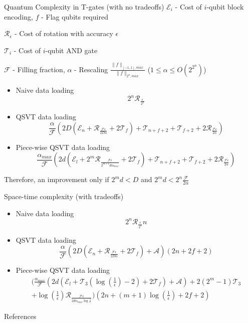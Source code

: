 \documentclass{beamer}
\begin{document}
\begin{frame}{Quantum Complexity in T-gates (with no tradeoffs)}
$\mathcal{E}_i$ - Cost of $i$-qubit block encoding, $f$ - Flag qubits required

$\mathcal{R}_{\epsilon}$ - Cost of rotation with accuracy $\epsilon$

$\mathcal{T}_i$ - Cost of $i$-qubit AND gate

$\mathcal{F}$ - Filling fraction, $\alpha$ - Rescaling $\frac{\|f\|_{[-1,1],max}}{\|f\|_{2^n,max}}$ ($1 \leq \alpha \leq O(2^{2^n})$)
\begin{itemize}
    \item Naive data loading
    $$
    2^n\mathcal{R}_{\frac{\epsilon}{2^n}}
    $$
    \item QSVT data loading
        $$
        \frac{\alpha}{\mathcal{F}}(2D(\mathcal{E}_n+\mathcal{R}_{\frac{\mathcal{F}\epsilon}{2D \alpha }}+2\mathcal{T}_f)+\mathcal{T}_{n+f+2}+\mathcal{T}_{f+2}+2\mathcal{R}_{\frac{\mathcal{F}\epsilon}{2 \alpha }})
        $$
    \item Piece-wise QSVT data loading
    $$
        \frac{\alpha_{max}}{\mathcal{F}}(2d(\mathcal{E}_l+2^m\mathcal{R}_{\frac{\mathcal{F}\epsilon}{2^{m+1}d  \alpha_{max} }}+2\mathcal{T}_f)+\mathcal{T}_{n+f+2}+\mathcal{T}_{f+2}+2\mathcal{R}_{\frac{\mathcal{F}\epsilon}{2 \alpha }})
        $$
\end{itemize}
    Therefore, an improvement only if $2^md < D$ and $2^md < 2^n\frac{\mathcal{F}}{2\alpha}$
\end{frame}
\begin{frame}{Space-time complexity (with tradeoffs)}
\begin{itemize}
    \item Naive data loading
    $$
    2^n\mathcal{R}_{\frac{\epsilon}{2^n}}n
    $$
    \item QSVT data loading
        $$
         \frac{\alpha}{\mathcal{F}}(2D(\mathcal{E}_n+\mathcal{R}_{\frac{\mathcal{F}\epsilon}{2D \alpha }}+2\mathcal{T}_f)+\mathcal{A})(2n + 2f+2)
        $$
    \item Piece-wise QSVT data loading
    \begin{multline*}
        \bigg( \frac{\alpha_{max}}{\mathcal{F}}(2d(\mathcal{E}_l+\mathcal{T}_3 (\log \left(\frac{1}{\epsilon}\right) -2)+2\mathcal{T}_f)+\mathcal{A})+ 2(2^m -1)\mathcal{T}_3\\ +\log \left(\frac{1}{\epsilon}\right) \mathcal{R}_{\frac{\mathcal{F}\epsilon}{2d \alpha_{max} \log \frac{1}{\epsilon}}}\bigg) 
        \left(2n + (m+1)\log\left( \frac{1}{\epsilon} \right) +2f +2\right)
    \end{multline*}
\end{itemize}
\end{frame}

\begin{frame}{References}


\end{frame}
\end{document}
